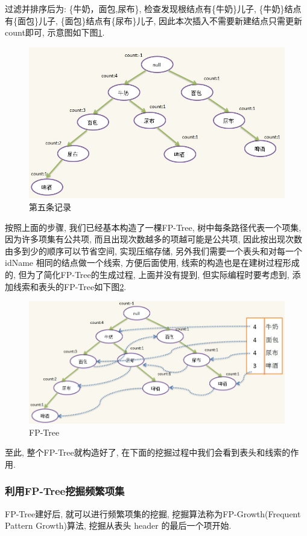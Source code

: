 \documentclass[a4paper,UTF8]{ctexart}
\theoremstyle{plain} \newtheorem{theorem}{定理}[section]
\theoremstyle{plain} \newtheorem{definition}{定义}[section]
\theoremstyle{plain} \newtheorem{lemma}{引理}[section]
\theoremstyle{plain} \newtheorem{proposition}{命题}[section]
\theoremstyle{plain} \newtheorem{example}{例}[section]
\theoremstyle{plain} \newtheorem{remark}{注}[section]
\theoremstyle{plain} \newtheorem{corollary}{推论}[section]
\begin{document}
\begin{enumerate}[(1)]
过滤并排序后为: \{牛奶，面包,尿布\}, 检查发现根结点有\{牛奶\}儿子, \{牛奶\}结点有\{面包\}儿子, \{面包\}结点有\{尿布\}儿子, 因此本次插入不需要新建结点只需更新count即可, 示意图如下图\ref{tree5}.
\begin{figure}[!htb]
	\centering
	\includegraphics[width = 0.75 \textwidth]{tree5.jpg}
	\caption{第五条记录}
	\label{tree5}
\end{figure}

\end{enumerate}

按照上面的步骤, 我们已经基本构造了一棵FP-Tree, 树中每条路径代表一个项集, 因为许多项集有公共项, 而且出现次数越多的项越可能是公共项, 因此按出现次数由多到少的顺序可以节省空间, 实现压缩存储, 另外我们需要一个表头和对每一个 idName 相同的结点做一个线索, 方便后面使用, 线索的构造也是在建树过程形成的, 但为了简化FP-Tree的生成过程, 上面并没有提到, 但实际编程时要考虑到, 添加线索和表头的FP-Tree如下图\ref{fptree}.
\begin{figure}[!htb]
	\centering
	\includegraphics[width = 0.75 \textwidth]{fptree.jpg}
	\caption{FP-Tree}
	\label{fptree}
\end{figure}

至此, 整个FP-Tree就构造好了, 在下面的挖掘过程中我们会看到表头和线索的作用.


\subsubsection{利用FP-Tree挖掘频繁项集}
FP-Tree建好后, 就可以进行频繁项集的挖掘, 挖掘算法称为FP-Growth(Frequent Pattern Growth)算法, 挖掘从表头 header 的最后一个项开始.
\end{document}
